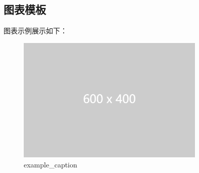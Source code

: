 \documentclass[zihao=-4]{ctexart}
\begin{document}
\begin{spacing}{1.5}
\section{图表模板}
图表示例展示如下：

\begin{figure}[H] %
    \centering %
    \includegraphics[width=0.8\textwidth]{example-image-2.png} %
    \caption{example\_caption} %
    \label{example_label} %
\end{figure}


\end{spacing}
\end{document}
